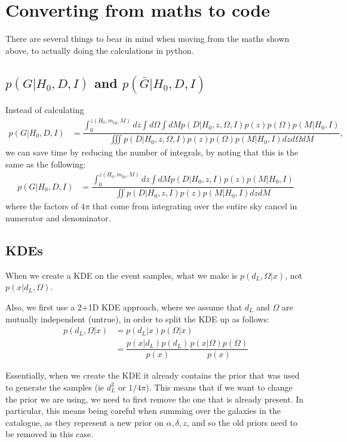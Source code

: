 \documentclass[a4paper,10pt]{article}
\begin{document}
\section{Converting from maths to code}
There are several things to bear in mind when moving from the maths shown above, to actually doing the calculations in python.

\subsection{$p(G|H_0,D,I)$ and $p(\bar{G}|H_0,D,I)$}
Instead of calculating 
\begin{equation}
\begin{aligned}
p(G|H_0,D,I) &= \dfrac{\int^{z(H_0,m_{\text{th}},M)}_0 dz \int d\Omega \int dM p(D|H_0,z,\Omega,I) p(z)p(\Omega)p(M|H_0,I)}{\iiint p(D|H_0,z,\Omega,I) p(z)p(\Omega)p(M|H_0,I) dz d\Omega dM},
\end{aligned}
\end{equation}
we can save time by reducing the number of integrals, by noting that this is the same as the following:
\begin{equation}
\begin{aligned}
p(G|H_0,D,I) &= \dfrac{\int^{z(H_0,m_{\text{th}},M)}_0 dz \int dM p(D|H_0,z,I) p(z)p(M|H_0,I)}{\iint p(D|H_0,z,I) p(z)p(M|H_0,I) dz dM}
\end{aligned}
\end{equation}
where the factors of $4\pi$ that come from integrating over the entire sky cancel in numerator and denominator.




\subsection{KDEs}
When we create a KDE on the event samples, what we make is $p(d_L,\Omega|x)$, not $p(x|d_L,\Omega)$.

Also, we first use a 2+1D KDE approach, where we assume that $d_L$ and $\Omega$ are mutually independent (untrue), in order to split the KDE up as follows:
\begin{equation}
\begin{aligned}
p(d_L,\Omega|x) &= p(d_L|x) p(\Omega|x)
\\ &= \dfrac{p(x|d_L) p(d_L)}{p(x)} \dfrac{p(x|\Omega) p(\Omega)}{p(x)}
\end{aligned}
\end{equation}

Essentially, when we create the KDE it already contains the prior that was used to generate the samples (ie $d_L^2$ or $1/4\pi$).  This means that if we want to change the prior we are using, we need to first remove the one that is already present.  In particular, this means being careful when summing over the galaxies in the catalogue, as they represent a new prior on $\alpha,\delta,z$, and so the old priors need to be removed in this case.
\end{document}
